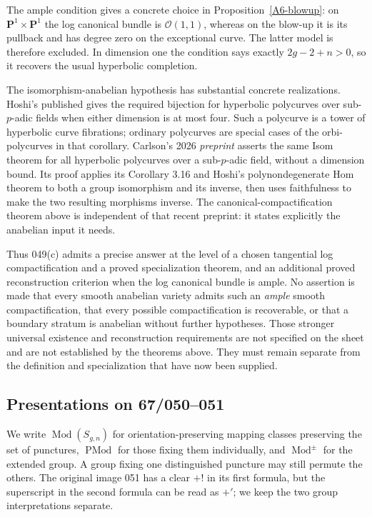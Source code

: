 The ample condition gives a concrete choice in Proposition~\ref{A6-blowup}: on $\mathbf P^1\times\mathbf P^1$ the log canonical bundle is $\mathcal O(1,1)$, whereas on the blow-up it is its pullback and has degree zero on the exceptional curve. The latter model is therefore excluded. In dimension one the condition says exactly $2g-2+n>0$, so it recovers the usual hyperbolic completion.

The isomorphism-anabelian hypothesis has substantial concrete realizations. Hoshi's published \cite[Corollary 3.18]{Hoshi2014A567} gives the required bijection for hyperbolic polycurves over sub-$p$-adic fields when either dimension is at most four. Such a polycurve is a tower of hyperbolic curve fibrations; ordinary polycurves are special cases of the orbi-polycurves in that corollary. Carlson's 2026 \emph{preprint} \cite[Theorem A = Theorem 3.11]{Carlson2026A567} asserts the same Isom theorem for all hyperbolic polycurves over a sub-$p$-adic field, without a dimension bound. Its proof applies its Corollary 3.16 and Hoshi's polynondegenerate Hom theorem to both a group isomorphism and its inverse, then uses faithfulness to make the two resulting morphisms inverse. The canonical-compactification theorem above is independent of that recent preprint: it states explicitly the anabelian input it needs.

Thus 049(c) admits a precise answer at the level of a chosen tangential log compactification and a proved specialization theorem, and an additional proved reconstruction criterion when the log canonical bundle is ample. No assertion is made that every smooth anabelian variety admits such an \emph{ample} smooth compactification, that every possible compactification is recoverable, or that a boundary stratum is anabelian without further hypotheses. Those stronger universal existence and reconstruction requirements are not specified on the sheet and are not established by the theorems above. They must remain separate from the definition and specialization that have now been supplied.





\subsection{Presentations on 67/050--051}
We write $\operatorname{Mod}(S_{g,n})$ for orientation-preserving mapping classes preserving the set of punctures, $\operatorname{PMod}$ for those fixing them individually, and $\operatorname{Mod}^{\pm}$ for the extended group. A group fixing one distinguished puncture may still permute the others. The original image 051 has a clear $+!$ in its first formula, but the superscript in the second formula can be read as $+'$; we keep the two group interpretations separate.

